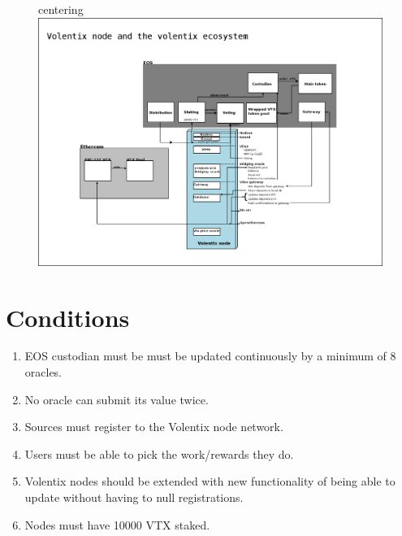 \documentclass[]{article}
\begin{document}
\begin{figure}
	centering
	\includegraphics[scale=0.2]{vltxnode.png}
	\caption{}
	\label{fig:whitebackground-ecosystem02}
\end{figure}

\section{Conditions}
\begin{enumerate}
	\item EOS custodian must be  must be updated continuously by a minimum of 8 oracles.
	\item No oracle can submit its value twice. 
	\item Sources must register to the Volentix node network.
	\item Users must be able to pick the work/rewards they do.
	\item Volentix nodes should be extended with new functionality of being able to update  without having to null registrations.
	\item Nodes must have 10000 VTX staked. 	
\end{enumerate}
\end{document}
